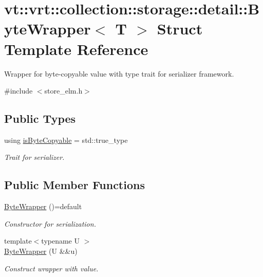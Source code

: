 \hypertarget{structvt_1_1vrt_1_1collection_1_1storage_1_1detail_1_1_byte_wrapper}{}\section{vt\+:\+:vrt\+:\+:collection\+:\+:storage\+:\+:detail\+:\+:Byte\+Wrapper$<$ T $>$ Struct Template Reference}
\label{structvt_1_1vrt_1_1collection_1_1storage_1_1detail_1_1_byte_wrapper}


Wrapper for byte-\/copyable value with type trait for serializer framework.  




{\ttfamily \#include $<$store\+\_\+elm.\+h$>$}

\subsection*{Public Types}
\begin{DoxyCompactItemize}
\item 
using \hyperlink{structvt_1_1vrt_1_1collection_1_1storage_1_1detail_1_1_byte_wrapper_acdae72612118580333a7c1422f191d67}{is\+Byte\+Copyable} = std\+::true\+\_\+type
\begin{DoxyCompactList}\small\item\em Trait for serializer. \end{DoxyCompactList}\end{DoxyCompactItemize}
\subsection*{Public Member Functions}
\begin{DoxyCompactItemize}
\item 
\hyperlink{structvt_1_1vrt_1_1collection_1_1storage_1_1detail_1_1_byte_wrapper_a17ff386194c6e36d2abaf1b9f39aa77f}{Byte\+Wrapper} ()=default
\begin{DoxyCompactList}\small\item\em Constructor for serialization. \end{DoxyCompactList}\item 
{\footnotesize template$<$typename U $>$ }\\\hyperlink{structvt_1_1vrt_1_1collection_1_1storage_1_1detail_1_1_byte_wrapper_a7a0530cbe40fae3f09fb15b55249fce4}{Byte\+Wrapper} (U \&\&u)
\begin{DoxyCompactList}\small\item\em Construct wrapper with value. \end{DoxyCompactList}\end{DoxyCompactItemize}
